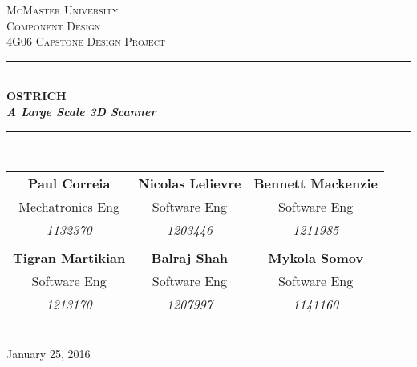 \documentclass[10pt,letterpaper]{article}
\begin{document}
	
	
	\begin{titlepage}
		\newcommand{\HRule}{\rule{\linewidth}{0.5mm}}
		\center
		
		\textsc{\LARGE McMaster University}\\[1.5cm] %
		\textsc{\Large Component Design}\\[0.5cm] %
		\textsc{\large 4G06 Capstone Design Project}\\[0.5cm] %
		
		\HRule \\[0.4cm] 
		{ \huge \bfseries OSTRICH \\[2mm] \textit{A Large Scale 3D Scanner}}\\[0.4cm] %
		\HRule \\[1.5cm]
		
		\begin{tabular}{ccc}
			\bf{Paul Correia}		& \bf{Nicolas Lelievre} 	& \bf{Bennett Mackenzie}		\\
			Mechatronics Eng 		& Software Eng 				& Software Eng 					\\
			\textit{1132370} 		& \textit{1203446}			& \textit{1211985} 				\\ \\
			\bf{Tigran Martikian} 	& \bf{Balraj Shah} 			& \bf{Mykola Somov} 			\\
			Software Eng			& Software Eng				& Software Eng 					\\
			\textit{1213170} 		& \textit{1207997}			& \textit{1141160}
		\end{tabular}\\[4cm]
		
		{\large January 25, 2016}\\[3cm] 
		
		
		\vfill %
		
	\end{titlepage}
	
    
\thispagestyle{empty}

\tableofcontents


\newpage


\thispagestyle{empty}

\listoffigures
\end{document}
